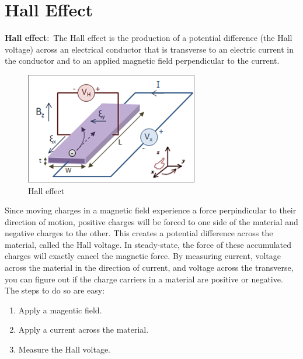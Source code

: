 \documentclass[nobib]{tufte-handout}
\newcommand{\defn}[2]{\noindent\textbf{#1}:\ #2}
\begin{document}
\section{Hall Effect}
\defn{Hall effect}{The Hall effect is the production of a potential 
difference (the Hall voltage) across an electrical conductor that 
is transverse to an electric current in the conductor and to an 
applied magnetic field perpendicular to the current}. 
\begin{figure}
    \center 
    \caption{Hall effect}
    \label{fig:hall}
    \includegraphics*{images/Hall_Effect_Measurement_Setup_for_Electrons.png}
\end{figure}
Since moving charges in a magnetic field experience a force perpindicular to their 
direction of motion, positive charges will be forced to one side of the material and 
negative charges to the other. This creates a potential difference across the material, 
called the Hall voltage. In steady-state, the force of these accumulated charges 
will exactly cancel the magnetic force. 
By measuring current, voltage across the material in the direction of current, 
and voltage across the transverse, you can figure out if the charge carriers 
in a material are positive or negative. 
The steps to do so are easy: 
\begin{enumerate}
    \item Apply a magentic field.
    \item Apply a current across the material. 
    \item Measure the Hall voltage. 
\end{enumerate}
\end{document}
